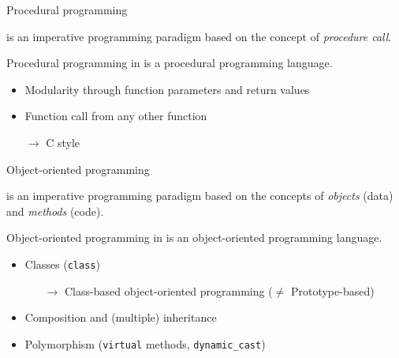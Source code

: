 \begin{frame}{Procedural programming}{}
  \begin{definition}
     is an imperative programming paradigm based on the concept of \emph{procedure call}.
  \end{definition}
  \begin{block}{Procedural programming in \CCLang}
    \CCLang is a procedural programming language.
    \begin{itemize}
    \item
      Modularity through function parameters and return values
    \item
      Function call from any other function
    \item[$\to$]
      C style
    \end{itemize}
  \end{block}
\end{frame}

\begin{frame}{Object-oriented programming}{}
  \begin{definition}
     is an imperative programming paradigm based on the concepts of \emph{objects} (data) and \emph{methods} (code).
  \end{definition}
  \begin{block}{Object-oriented programming in \CCLang}
    \CCLang is an object-oriented programming language.
    \begin{itemize}
    \item
      Classes (\lstinline!class!)
      \begin{itemize}
      \item[$\to$]
        Class-based object-oriented programming ($\neq$ Prototype-based)
      \end{itemize}
    \item
      Composition and (multiple) inheritance
    \item
      Polymorphism (\lstinline!virtual! methods, \lstinline!dynamic_cast!)
    \end{itemize}
  \end{block}
\end{frame}

